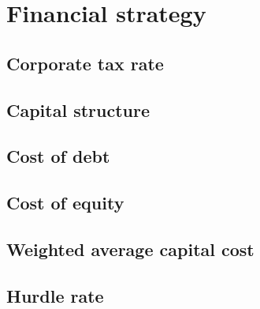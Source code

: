 \section{Financial strategy}
\subsection{Corporate tax rate}


\subsection{Capital structure}
\subsection{Cost of debt}
\subsection{Cost of equity}
\subsection{Weighted average capital cost}
\subsection{Hurdle rate}
